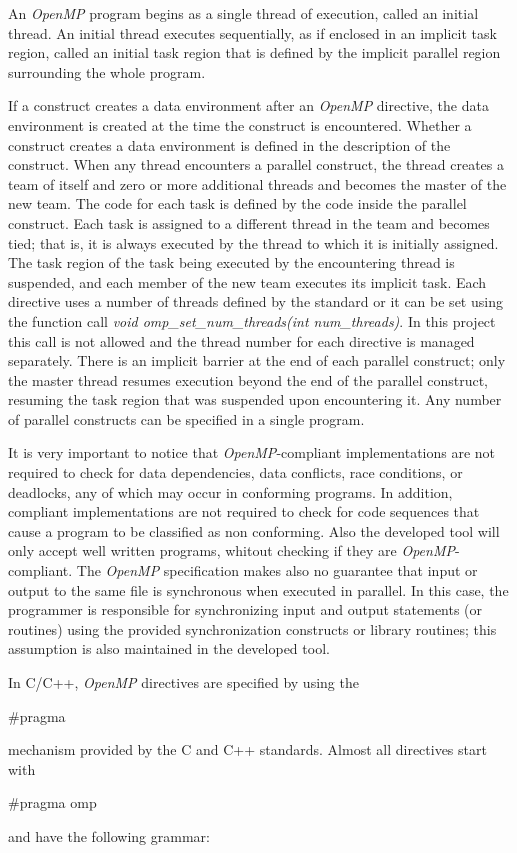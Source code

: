 \documentclass[a4paper,11pt,oneside]{book}
\begin{document}
An \emph{OpenMP} program begins as a single thread of execution, called an initial thread. An initial thread executes sequentially, as if enclosed in an implicit task region, called an initial task region that is defined by the implicit parallel region surrounding the whole program.

If a construct creates a data environment after an \emph{OpenMP} directive, the data environment is created at the time the construct is encountered. Whether a construct creates a data environment is defined in the description of the construct. When any thread encounters a parallel construct, the thread creates a team of itself and zero or more additional threads and becomes the master of the new team. The code for each task is defined by the code inside the parallel construct. Each task is assigned to a different thread in the team and becomes tied; that is, it is always executed by the thread to which it is initially assigned. The task region of the task being executed by the encountering thread is suspended, and each member of the new team executes its implicit task. Each directive uses a number of threads defined by the standard or it can be set using the function call \emph{void omp\_set\_num\_threads(int num\_threads)}. In this project this call is not allowed and the thread number for each directive is managed separately. There is an implicit barrier at the end of each parallel construct; only the master thread resumes execution beyond the end of the parallel construct, resuming the task region that was suspended upon encountering it. Any number of parallel constructs can be specified in a single program. 

It is very important to notice that \emph{OpenMP}-compliant implementations are not required to check for data dependencies, data conflicts, race conditions, or deadlocks, any of which may occur in conforming programs. In addition, compliant implementations are not required to check for code sequences that cause a program to be classified as non conforming. Also the developed tool will only accept well written programs, whitout checking if they are \emph{OpenMP}-compliant. The \emph{OpenMP} specification makes also no guarantee that input or output to the same file is synchronous when executed in parallel. In this case, the programmer is responsible for synchronizing input and output statements (or routines) using the provided synchronization constructs or library routines; this assumption is also maintained in the developed tool.

In C/C++, \emph{OpenMP} directives are specified by using the\begin{bf} $\#$pragma\end{bf} mechanism provided by the C and C++ standards.  Almost all directives start with \begin{bf}$\#$pragma omp\end{bf} and have the following grammar:
\begin{bf}{}\end{bf}
\\
\end{document}
